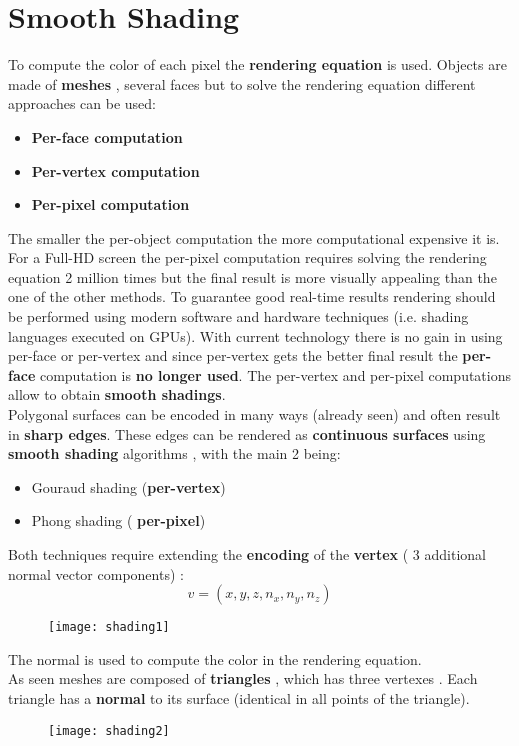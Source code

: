 \newpage
\section{Smooth Shading}
To compute the color of each pixel the \textbf{rendering equation} is used. Objects are made of \textbf{meshes} , several faces  but to solve the rendering equation different approaches can be used:
\begin{itemize}
\item \textbf{Per-face computation}
\item \textbf{Per-vertex computation}
\item \textbf{Per-pixel computation} 
\end{itemize}
The smaller the per-object computation the more computational expensive it is. For a Full-HD screen the per-pixel computation requires solving the rendering equation 2 million times but the final result is more visually appealing than the one of the other methods. To guarantee good real-time results rendering should be performed using modern software and hardware techniques (i.e. shading languages executed on GPUs).
With current technology there is no gain in using per-face or per-vertex and since per-vertex gets the better final result the \textbf{per-face} computation is \textbf{no longer used}. The per-vertex and per-pixel computations allow to obtain \textbf{smooth shadings}.\\
Polygonal surfaces can be encoded in many ways (already seen) and often result in \textbf{sharp edges}. These edges can be rendered as \textbf{continuous surfaces} using \textbf{smooth shading} algorithms , with the main 2 being: 
\begin{itemize}
\item Gouraud shading (\textbf{per-vertex})
\item Phong shading ( \textbf{per-pixel})
\end{itemize}
Both techniques require extending the \textbf{encoding} of the \textbf{vertex} ( 3 additional normal vector components) : $$ v = (x,y,z,n_x,n_y,n_z)$$
\begin{figure}[H]
  \centering
  \texttt{[image: shading1]}
\end{figure}
The normal is used to compute the color in the rendering equation.\\
As seen meshes are composed of \textbf{triangles} , which has three vertexes . Each triangle has a \textbf{normal} to its surface (identical in all points of the triangle).
\begin{figure}[H]
  \centering
  \texttt{[image: shading2]}
\end{figure}

